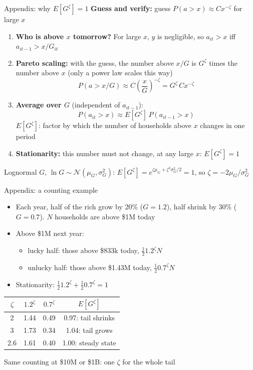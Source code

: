 \documentclass[10pt,english,10pt,handout]{beamer}
\begin{document}
\appendix

\begin{frame}[label=route2-proof]{Appendix: why $E[G^{\zeta}]=1$}
\small
\textbf{Guess and verify:} guess $P(a>x)\approx Cx^{-\zeta}$ for large $x$
\begin{enumerate}
\item \textbf{Who is above $x$ tomorrow?} For large $x$, $y$ is negligible, so $a_{it}>x$ iff $a_{it-1}>x/G_{it}$
\item \textbf{Pareto scaling:} with the guess, the number above $x/G$ is $G^{\zeta}$ times the number above $x$ (only a power law scales this way)
\[
P\left(a>x/G\right)\approx C\left(\frac{x}{G}\right)^{-\zeta}=G^{\zeta}\,Cx^{-\zeta}
\]
\item \textbf{Average over $G$} (independent of $a_{it-1}$):
\[
P(a_{it}>x)\approx E\left[G^{\zeta}\right]\,P(a_{it-1}>x)
\]
$E[G^{\zeta}]$: factor by which the number of households above $x$ changes in one period
\item \textbf{Stationarity:} this number must not change, at any large $x$: $\boxed{E\left[G^{\zeta}\right]=1}$
\end{enumerate}
{Lognormal $G$, $\ln G\sim\mathcal{N}(\mu_{G},\sigma_{G}^{2})$: $E[G^{\zeta}]=e^{\zeta\mu_{G}+\zeta^{2}\sigma_{G}^{2}/2}=1$, so $\zeta=-2\mu_{G}/\sigma_{G}^{2}$}
\hfill\hyperlink{route2}{}
\end{frame}

\begin{frame}{Appendix: a counting example}
\begin{itemize}
\item Each year, half of the rich grow by 20\% ($G=1.2$), half shrink by 30\% ($G=0.7$). $N$ households are above \$1M today
\item Above \$1M next year:
\begin{itemize}
\item lucky half: those above \$833k today, $\frac{1}{2}1.2^{\zeta}N$
\item unlucky half: those above \$1.43M today, $\frac{1}{2}0.7^{\zeta}N$
\end{itemize}
\item Stationarity: $\frac{1}{2}1.2^{\zeta}+\frac{1}{2}0.7^{\zeta}=1$
\end{itemize}
{
\begin{center}
\begin{tabular}{cccc}
\toprule
$\zeta$ & $1.2^{\zeta}$ & $0.7^{\zeta}$ & $E[G^{\zeta}]$\\
\midrule
2 & 1.44 & 0.49 & 0.97: tail shrinks\\
3 & 1.73 & 0.34 & 1.04: tail grows\\
2.6 & 1.61 & 0.40 & 1.00: steady state\\
\bottomrule
\end{tabular}
\end{center}}
{Same counting at \$10M or \$1B: one $\zeta$ for the whole tail}
\hfill\hyperlink{route2}{}
\end{frame}
\end{document}
